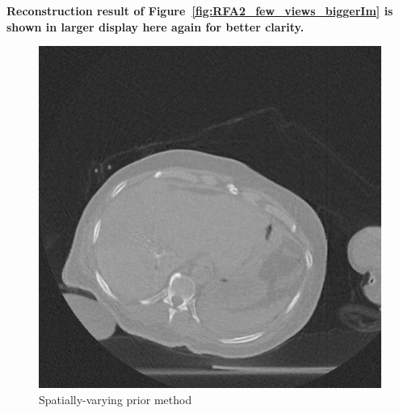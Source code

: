 \documentclass{article}
\begin{document}
\newpage
\textbf{Reconstruction result of Figure~\ref{fig:RFA2_few_views_biggerIm} is shown in larger display here  again for better clarity.}\\
\begin{figure}[!h]
\centering
\includegraphics[width=1.2\columnwidth]{../images/tmh/RFA2/few_views/weighted_pca_all_methods_kk_0_01.png}
\captionsetup{labelformat=empty}
\caption[Representative results-2]{\large{Spatially-varying prior method}}
\label{fig:RFA2_few_views_bigger}
\end{figure}
\newpage

\end{document}
